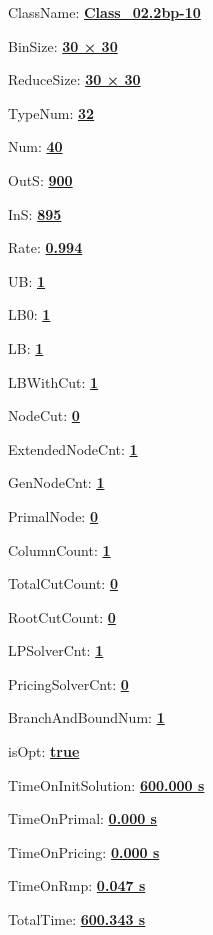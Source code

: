 \documentclass[11pt]{article}
\begin{document}
\pagestyle{empty}


ClassName: \underline{\textbf{Class_02.2bp-10}}
\par
BinSize: \underline{\textbf{30 × 30}}
\par
ReduceSize: \underline{\textbf{30 × 30}}
\par
TypeNum: \underline{\textbf{32}}
\par
Num: \underline{\textbf{40}}
\par
OutS: \underline{\textbf{900}}
\par
InS: \underline{\textbf{895}}
\par
Rate: \underline{\textbf{0.994}}
\par
UB: \underline{\textbf{1}}
\par
LB0: \underline{\textbf{1}}
\par
LB: \underline{\textbf{1}}
\par
LBWithCut: \underline{\textbf{1}}
\par
NodeCut: \underline{\textbf{0}}
\par
ExtendedNodeCnt: \underline{\textbf{1}}
\par
GenNodeCnt: \underline{\textbf{1}}
\par
PrimalNode: \underline{\textbf{0}}
\par
ColumnCount: \underline{\textbf{1}}
\par
TotalCutCount: \underline{\textbf{0}}
\par
RootCutCount: \underline{\textbf{0}}
\par
LPSolverCnt: \underline{\textbf{1}}
\par
PricingSolverCnt: \underline{\textbf{0}}
\par
BranchAndBoundNum: \underline{\textbf{1}}
\par
isOpt: \underline{\textbf{true}}
\par
TimeOnInitSolution: \underline{\textbf{600.000 s}}
\par
TimeOnPrimal: \underline{\textbf{0.000 s}}
\par
TimeOnPricing: \underline{\textbf{0.000 s}}
\par
TimeOnRmp: \underline{\textbf{0.047 s}}
\par
TotalTime: \underline{\textbf{600.343 s}}
\par
\newpage
\end{document}
